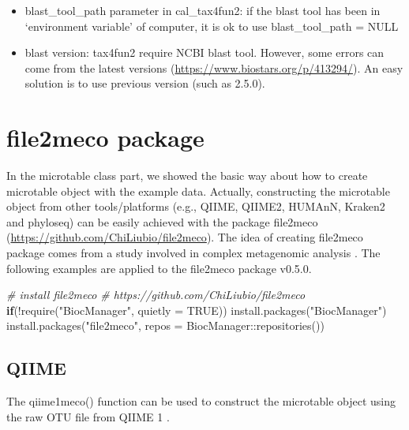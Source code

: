 \documentclass[
]{book}
\newenvironment{Shaded}{\begin{snugshade}}{\end{snugshade}}
\newcommand{\AttributeTok}[1]{\textcolor[rgb]{0.77,0.63,0.00}{#1}}
\newcommand{\CommentTok}[1]{\textcolor[rgb]{0.56,0.35,0.01}{\textit{#1}}}
\newcommand{\ConstantTok}[1]{\textcolor[rgb]{0.00,0.00,0.00}{#1}}
\newcommand{\ControlFlowTok}[1]{\textcolor[rgb]{0.13,0.29,0.53}{\textbf{#1}}}
\newcommand{\FunctionTok}[1]{\textcolor[rgb]{0.00,0.00,0.00}{#1}}
\newcommand{\NormalTok}[1]{#1}
\newcommand{\SpecialCharTok}[1]{\textcolor[rgb]{0.00,0.00,0.00}{#1}}
\newcommand{\StringTok}[1]{\textcolor[rgb]{0.31,0.60,0.02}{#1}}
\providecommand{\tightlist}{%
  \setlength{\itemsep}{0pt}\setlength{\parskip}{0pt}}
\begin{document}
\begin{itemize}
\tightlist
\item
  blast\_tool\_path parameter in cal\_tax4fun2: if the blast tool has been in `environment variable' of computer, it is ok to use blast\_tool\_path = NULL
\item
  blast version: tax4fun2 require NCBI blast tool. However, some errors can come from the latest versions (\url{https://www.biostars.org/p/413294/}). An easy solution is to use previous version (such as 2.5.0).
\end{itemize}

\hypertarget{file2meco-package}{%
\chapter{file2meco package}\label{file2meco-package}}

In the microtable class part, we showed the basic way about how to create microtable object with the example data.
Actually, constructing the microtable object from other tools/platforms (e.g., QIIME, QIIME2, HUMAnN, Kraken2 and phyloseq)
can be easily achieved with the package file2meco (\url{https://github.com/ChiLiubio/file2meco}).
The idea of creating file2meco package comes from a study involved in complex metagenomic analysis \citep{Liu_Microbial_2022}.
The following examples are applied to the file2meco package v0.5.0.

\begin{Shaded}
\begin{Highlighting}[]
\CommentTok{\# install file2meco}
\CommentTok{\# https://github.com/ChiLiubio/file2meco}
\ControlFlowTok{if}\NormalTok{(}\SpecialCharTok{!}\FunctionTok{require}\NormalTok{(}\StringTok{"BiocManager"}\NormalTok{, }\AttributeTok{quietly =} \ConstantTok{TRUE}\NormalTok{)) }\FunctionTok{install.packages}\NormalTok{(}\StringTok{"BiocManager"}\NormalTok{)}
\FunctionTok{install.packages}\NormalTok{(}\StringTok{"file2meco"}\NormalTok{, }\AttributeTok{repos =}\NormalTok{ BiocManager}\SpecialCharTok{::}\FunctionTok{repositories}\NormalTok{())}
\end{Highlighting}
\end{Shaded}

\hypertarget{qiime}{%
\section{QIIME}\label{qiime}}

The qiime1meco() function can be used to construct the microtable object using the raw OTU file from QIIME 1 \citep{Caporaso_QIIME_2010}.
\end{document}
